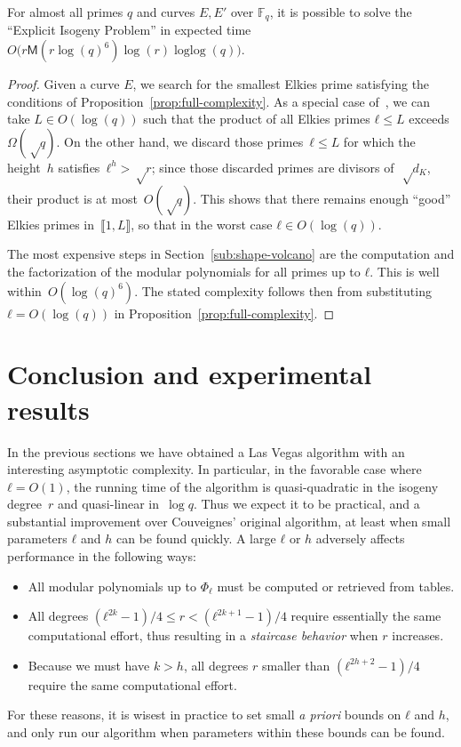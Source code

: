\documentclass{lms}
\def\cout#1{\mathsf{#1}}
\newcommand{\F}{\mathbb{F}}
\newcommand{\MM}{\cout{M}}
\DeclareMathOperator{\loglog}{loglog}
\begin{document}
\begin{thm*}
  For almost all primes $q$ and curves $E,E'$ over $\F_q$, it is
  possible to solve the “Explicit Isogeny Problem” in expected time
  $O\bigl(r \MM(r\log(q)^6) \log(r) \loglog(q) \bigr)$.
\end{thm*}

\begin{proof}
  Given a curve $E$, we search for the smallest Elkies prime
  satisfying the conditions of Proposition~\ref{prop:full-complexity}.
  As a special case of~\cite[Theorem~1]{shparlinski2014distribution},
  we can take $L∈O(\log(q))$ such that the product of all
  Elkies primes $ℓ≤L$ exceeds $Ω(√q)$.
On the other hand, we discard those primes~$ℓ ≤ L$ for which
the height~$h$ satisfies~$ℓ^{h} > √r$;
since those discarded primes are divisors of~$√{d_K}$,
their product is at most~$O(√q)$.
This shows that there remains enough “good” Elkies primes
in~$\llbracket 1,L\rrbracket$,
so that in the worst case $ℓ ∈ O(\log(q))$.

  The most expensive steps in Section~\ref{sub:shape-volcano} are
  the computation and the factorization of the modular polynomials
  for all primes up to $ℓ$.
  This is well within~$O(\log(q)^6)$.
  The stated complexity follows then from
  substituting~$ℓ = O(\log(q))$
  in Proposition~\ref{prop:full-complexity}.
\end{proof}

\section{Conclusion and experimental results}
\label{sec:implem}

In the previous sections we have obtained a Las Vegas algorithm with
an interesting asymptotic complexity.  In particular, in the favorable
case where~$ℓ = O(1)$, the running time of the algorithm is
quasi-quadratic in the isogeny degree~$r$ and quasi-linear in~$\log
q$.  Thus we expect it to be practical, and a substantial improvement
over Couveignes' original algorithm, at least when small parameters
$ℓ$ and $h$ can be found quickly. A large $ℓ$ or $h$ adversely affects
performance in the following ways:
\begin{itemize}
\item All modular polynomials up to $Φ_ℓ$ must be computed or
  retrieved from tables.
\item All degrees $(ℓ^{2k}-1)/4≤r<(ℓ^{2k+1}-1)/4$ require essentially
  the same computational effort, thus resulting in a \emph{staircase
    behavior} when $r$ increases.
\item Because we must have $k>h$, all degrees $r$ smaller than
  $(ℓ^{2h+2}-1)/4$ require the same computational effort.
\end{itemize}
For these reasons, it is wisest in practice to set small \emph{a
  priori} bounds on $ℓ$ and $h$, and only run our algorithm when
parameters within these bounds can be found.
\end{document}
